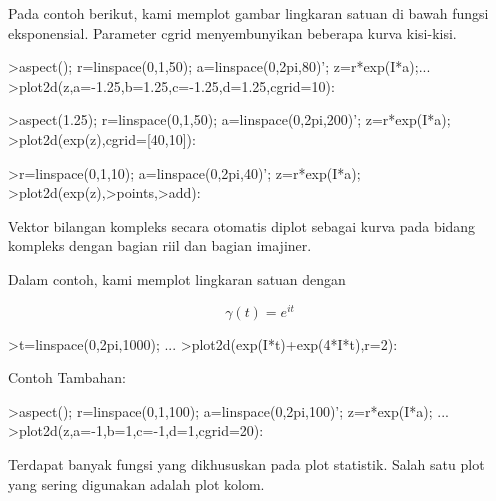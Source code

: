 \documentclass[12pt,arial,letterpaper]{book}
\begin{document}
\begin{eulercomment}
\begin{eulercomment}
\begin{eulercomment}
\begin{eulercomment}
\begin{eulercomment}
\begin{eulercomment}
\begin{eulercomment}
\begin{eulercomment}
\begin{eulercomment}
\begin{eulercomment}
\begin{eulercomment}
\begin{eulercomment}
\begin{eulercomment}
\begin{eulercomment}
\begin{eulercomment}
\begin{eulercomment}
\begin{eulercomment}
Pada contoh berikut, kami memplot gambar lingkaran satuan di bawah
fungsi eksponensial. Parameter cgrid menyembunyikan beberapa kurva
kisi-kisi.
\end{eulercomment}
\begin{eulerprompt}
>aspect(); r=linspace(0,1,50); a=linspace(0,2pi,80)'; z=r*exp(I*a);...
>plot2d(z,a=-1.25,b=1.25,c=-1.25,d=1.25,cgrid=10):
\end{eulerprompt}
\begin{eulerprompt}
>aspect(1.25); r=linspace(0,1,50); a=linspace(0,2pi,200)'; z=r*exp(I*a);
>plot2d(exp(z),cgrid=[40,10]):
\end{eulerprompt}
\begin{eulerprompt}
>r=linspace(0,1,10); a=linspace(0,2pi,40)'; z=r*exp(I*a);
>plot2d(exp(z),>points,>add):
\end{eulerprompt}
\begin{eulercomment}
Vektor bilangan kompleks secara otomatis diplot sebagai kurva pada
bidang kompleks dengan bagian riil dan bagian imajiner.

Dalam contoh, kami memplot lingkaran satuan dengan

\end{eulercomment}
\begin{eulerformula}
\[
\gamma(t) = e^{it}
\]
\end{eulerformula}
\begin{eulerprompt}
>t=linspace(0,2pi,1000); ...
>plot2d(exp(I*t)+exp(4*I*t),r=2):
\end{eulerprompt}
\begin{eulercomment}
Contoh Tambahan:
\end{eulercomment}
\begin{eulerprompt}
>aspect(); r=linspace(0,1,100); a=linspace(0,2pi,100)'; z=r*exp(I*a); ...
>plot2d(z,a=-1,b=1,c=-1,d=1,cgrid=20):
\end{eulerprompt}
\begin{eulercomment}
Terdapat banyak fungsi yang dikhususkan pada plot statistik. Salah
satu plot yang sering digunakan adalah plot kolom.


\end{eulercomment}
\end{eulercomment}
\end{eulercomment}
\end{eulercomment}
\end{eulercomment}
\end{eulercomment}
\end{eulercomment}
\end{eulercomment}
\end{eulercomment}
\end{eulercomment}
\end{eulercomment}
\end{eulercomment}
\end{eulercomment}
\end{eulercomment}
\end{eulercomment}
\end{eulercomment}
\end{eulercomment}
\end{document}
